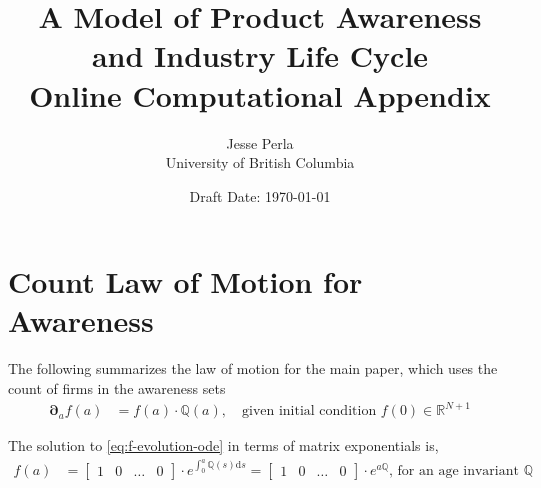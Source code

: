 \documentclass[12pt]{article}
\newcommand{\R}{\ensuremath{\mathbb{R}}}
\newcommand{\Q}[0]{\ensuremath{\mathbb{Q}}}
\newcommand{\D}[1][]{\ensuremath{\boldsymbol{\partial}_{#1}}}
\newcommand{\diff}{\ensuremath{\mathrm{d}}}
\begin{document}
\title{\Large A Model of Product Awareness and Industry Life Cycle\\
Online Computational  Appendix
}
\author{Jesse Perla \\ University of British Columbia}
\date{Draft Date: \today}
\maketitle
\appendix
\makeatletter
\def\@seccntformat#1{Appendix\ \csname the#1\endcsname\quad}
\makeatother
\makeatletter
\def\@seccntformat#1{\csname Pref@#1\endcsname \csname the#1\endcsname\quad}
\def\Pref@section{Appendix~}
\makeatother
{}

\section{Count Law of Motion for Awareness}
The following summarizes the law of motion for the main paper, which uses the count of firms in the awareness sets
\begin{align}
	\D[a]f(a) &= f(a) \cdot \Q(a),\quad \text{given initial condition } f(0)\in\R^{N+1}\label{eq:f-evolution-ode}
	\end{align}
	
	\noindent The solution to \cref{eq:f-evolution-ode} in terms of matrix exponentials is, %
	\begin{align}
	f(a) &= \begin{bmatrix}1 & 0 & \ldots & 0\end{bmatrix}\cdot e^{\int_{0}^{a} \Q(s)\diff s} %
	= \begin{bmatrix}1 & 0 & \ldots & 0\end{bmatrix}\cdot e^{a\Q},\, \text{for an age invariant $\Q$}\label{eq:f-constant-Q-evolution}
\end{align}
\end{document}
